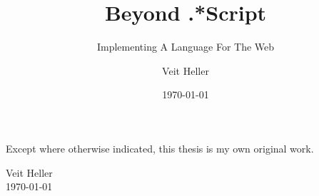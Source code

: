 \documentclass[oneside,11pt,xetex]{scrbook}
\begin{document}
\title{Beyond .*Script}
\subtitle{Implementing A Language For The Web}

\author{Veit Heller}

\date{\today}

\publishers{%
  \normalsize{%
  A thesis submitted for the degree of \\
  B.Sc. of Applied Computer Science of \\
  The University of Applied Sciences Berlin}}

\uppertitleback{%
  \textbf{Institutional Address}\\
  HTW Berlin\\
  Campus Treskowallee\\
  Treskowallee 8\\
  10318 Berlin\\
  \textsc{Germany}\\
  \bigskip\\
  \textbf{Supervisory Panel}\\

  Prof. Hendrik Gärtner\\
  HTW Berlin\\

  Prof. Henrick Lochmann\\
  Prof. Henrik Lochmann\\
  HTW Berlin\\
  \bigskip\\
  Set with the help of {\KOMAScript} and
  \XeLaTeX.\\

  \copyright~\the\year. All rights reserved.}

\dedication{\small{\emph{For Meredith, Tobias and all the people who cope with me. Your undying support will not be forgotten.}}}

\maketitle

\frontmatter

\vspace*{0.4\textheight}

\begin{center}
  Except where otherwise indicated, this thesis is my own original
  work.
\end{center}
\vspace*{4cm}

\begin{flushright}
  \begin{minipage}{4cm}
    Veit Heller\\
    \today
  \end{minipage}
\end{flushright}
\end{document}
